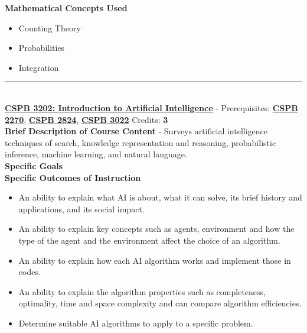 \documentclass{article}
\newcommand{\horizontalline}{\noindent \rule{\textwidth}{0.5pt} \\}
\begin{document}
\noindent \textbf{Mathematical Concepts Used}
\begin{itemize}
    \item Counting Theory
    \item Probabilities
    \item Integration
\end{itemize}
\horizontalline
\noindent \href{https://www.colorado.edu/program/cspb/cspb-3202-introduction-artificial-intelligence}{\textbf{CSPB 3202: Introduction to Artificial Intelligence}} - Prerequisites: \href{https://www.colorado.edu/program/cspb/cspb-2270-computer-science-2-data-structures}{\textbf{CSPB 2270}}, \href{https://www.colorado.edu/program/cspb/cspb-2824-discrete-structures}{\textbf{CSPB 2824}}, \href{https://www.colorado.edu/program/cspb/cspb-3022-introduction-data-science-probability-and-statistics}{\textbf{CSPB 3022}} Credits: \textbf{3} \\

\noindent \textbf{Brief Description of Course Content} - Surveys artificial intelligence techniques of search, knowledge representation and reasoning, probabilistic inference, machine learning, and natural language. \\

\noindent \textbf{Specific Goals} \\

\noindent \textbf{Specific Outcomes of Instruction}
\begin{itemize}
    \item An ability to explain what AI is about, what it can solve, its brief history and applications, and its social impact.
    \item An ability to explain key concepts such as agents, environment and how the type of the agent and the environment affect the choice of an algorithm.
    \item An ability to explain how each AI algorithm works and implement those in codes.
    \item An ability to explain the algorithm properties such as completeness, optimality, time and space complexity and can compare algorithm efficiencies.
    \item Determine suitable AI algorithms to apply to a specific problem.
\end{itemize}
\end{document}
